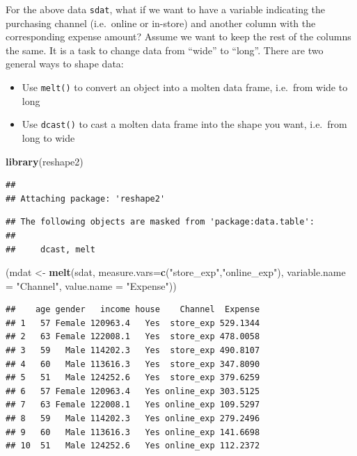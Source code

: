 \documentclass[]{book}
\newenvironment{Shaded}{\begin{snugshade}}{\end{snugshade}}
\newcommand{\KeywordTok}[1]{\textcolor[rgb]{0.13,0.29,0.53}{\textbf{{#1}}}}
\newcommand{\DataTypeTok}[1]{\textcolor[rgb]{0.13,0.29,0.53}{{#1}}}
\newcommand{\StringTok}[1]{\textcolor[rgb]{0.31,0.60,0.02}{{#1}}}
\newcommand{\NormalTok}[1]{{#1}}
\providecommand{\tightlist}{%
  \setlength{\itemsep}{0pt}\setlength{\parskip}{0pt}}
\theoremstyle{definition}
\theoremstyle{definition}
\theoremstyle{remark}
\begin{document}
For the above data \texttt{sdat}, what if we want to have a variable
indicating the purchasing channel (i.e.~online or in-store) and another
column with the corresponding expense amount? Assume we want to keep the
rest of the columns the same. It is a task to change data from ``wide''
to ``long''. There are two general ways to shape data:

\begin{itemize}
\tightlist
\item
  Use \texttt{melt()} to convert an object into a molten data frame,
  i.e.~from wide to long
\item
  Use \texttt{dcast()} to cast a molten data frame into the shape you
  want, i.e.~from long to wide
\end{itemize}

\begin{Shaded}
\begin{Highlighting}[]
\KeywordTok{library}\NormalTok{(reshape2)}
\end{Highlighting}
\end{Shaded}

\begin{verbatim}
## 
## Attaching package: 'reshape2'
\end{verbatim}

\begin{verbatim}
## The following objects are masked from 'package:data.table':
## 
##     dcast, melt
\end{verbatim}

\begin{Shaded}
\begin{Highlighting}[]
\NormalTok{(mdat <-}\StringTok{ }\KeywordTok{melt}\NormalTok{(sdat, }\DataTypeTok{measure.vars=}\KeywordTok{c}\NormalTok{(}\StringTok{"store_exp"}\NormalTok{,}\StringTok{"online_exp"}\NormalTok{),}
              \DataTypeTok{variable.name =} \StringTok{"Channel"}\NormalTok{,}
              \DataTypeTok{value.name =} \StringTok{"Expense"}\NormalTok{))}
\end{Highlighting}
\end{Shaded}

\begin{verbatim}
##    age gender   income house    Channel  Expense
## 1   57 Female 120963.4   Yes  store_exp 529.1344
## 2   63 Female 122008.1   Yes  store_exp 478.0058
## 3   59   Male 114202.3   Yes  store_exp 490.8107
## 4   60   Male 113616.3   Yes  store_exp 347.8090
## 5   51   Male 124252.6   Yes  store_exp 379.6259
## 6   57 Female 120963.4   Yes online_exp 303.5125
## 7   63 Female 122008.1   Yes online_exp 109.5297
## 8   59   Male 114202.3   Yes online_exp 279.2496
## 9   60   Male 113616.3   Yes online_exp 141.6698
## 10  51   Male 124252.6   Yes online_exp 112.2372
\end{verbatim}
\end{document}
